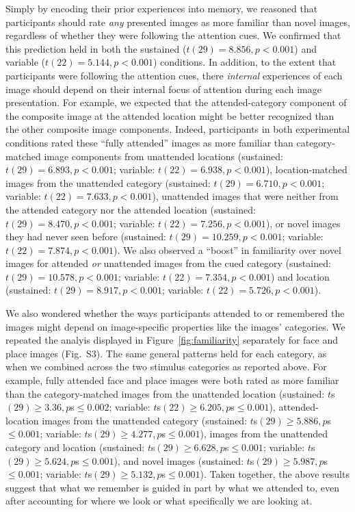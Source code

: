 \documentclass[english]{article}
\newcommand{\ratingsByCategory}{S3}
\begin{document}
Simply by encoding their prior experiences into memory, we reasoned that
participants should rate \textit{any} presented images as more familiar than
novel images, regardless of whether they were following the attention cues. We
confirmed that this prediction held in both the sustained ($t(29) = 8.856, p <
0.001$) and variable ($t(22) = 5.144, p < 0.001$) conditions. In addition, to
the extent that participants were following the attention cues, there
\textit{internal} experiences of each image should depend on their internal
focus of attention during each image presentation. For example, we expected
that the attended-category component of the composite image at the attended
location might be better recognized than the other composite image components.
Indeed, participants in both experimental conditions rated these ``fully
attended'' images as more familiar than category-matched image components from
unattended locations (sustained: $t(29) = 6.893, p < 0.001$; variable: $t(22) =
6.938, p < 0.001$), location-matched images from the unattended category
(sustained: $t(29) = 6.710, p < 0.001$; variable: $t(22) = 7.633, p < 0.001$),
unattended images that were neither from the attended category nor the attended
location (sustained: $t(29) = 8.470, p < 0.001$; variable: $t(22) = 7.256, p <
0.001$), or novel images they had never seen before (sustained: $t(29) =
10.259, p < 0.001$; variable: $t(22) = 7.874, p < 0.001$). We also observed a
``boost'' in familiarity over novel images for attended \textit{or} unattended
images from the cued category (sustained: $t(29) = 10.578, p < 0.001$;
variable: $t(22) = 7.354, p < 0.001$) and location (sustained: $t(29) = 8.917,
p < 0.001$; variable: $t(22) = 5.726, p < 0.001$).

We also wondered whether the ways participants attended to or remembered the
images might depend on image-specific properties like the images' categories.
We repeated the analyis displayed in Figure~\ref{fig:familiarity} separately
for face and place images (Fig.~\ratingsByCategory). The same general patterns
held for each category, as when we combined across the two stimulus categories
as reported above. For example, fully attended face and place images were both
rated as more familiar than the category-matched images from the unattended
location (sustained: $t$s$(29) \geq 3.36, p$s$ \leq 0.002$; variable: $t$s$(22)
\geq 6.205, p$s$ \leq 0.001$), attended-location images from the unattended
category (sustained: $t$s$(29) \geq 5.886, p$s$ \leq 0.001$; variable:
$t$s$(29) \geq 4.277, p$s$ \leq 0.001$), images from the unattended category
and location (sustained: $t$s$(29) \geq 6.628, p$s$ \leq 0.001$; variable:
$t$s$(29) \geq 5.624, p$s$ \leq 0.001$), and novel images (sustained: $t$s$(29)
\geq 5.987, p$s$ \leq 0.001$; variable: $t$s$(29) \geq 5.132, p$s$ \leq
0.001$). Taken together, the above results suggest that what we remember is
guided in part by what we attended to, even after accounting for where we look
or what specifically we are looking at.
\end{document}
